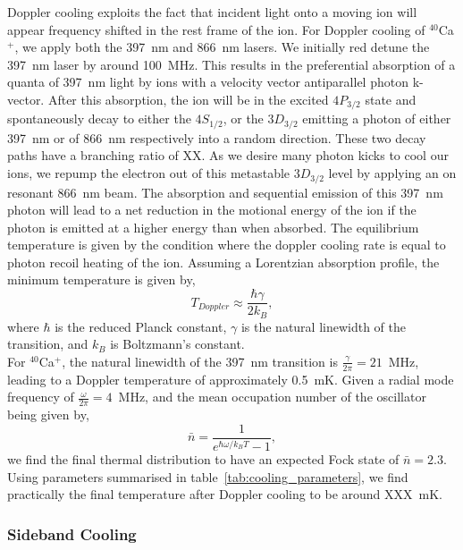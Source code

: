     Doppler cooling exploits the fact that incident light onto a moving ion will
    appear frequency shifted in the rest frame of the ion. For Doppler cooling
    of $^{40}$Ca$^+$, we apply both the 397~nm and 866~nm lasers. We initially red
    detune the 397~nm laser by around 100~MHz. This results in the preferential
    absorption of a quanta of 397~nm light by ions with a velocity vector
    antiparallel photon k-vector. After this absorption, the ion will be in the
    excited $4P_{3/2}$ state and spontaneously decay to either the $4S_{1/2}$,
    or the $3D_{3/2}$ emitting a photon of either 397~nm or of 866~nm
    respectively into a random direction. These two decay paths have a branching
    ratio of XX.  As we desire many photon kicks to cool our ions, we repump the
    electron out of this metastable $3D_{3/2}$ level by applying an on resonant
    866~nm beam.  The absorption and sequential emission of this 397~nm photon
    will lead to a net reduction in the motional energy of the ion if the photon
    is emitted at a higher energy than when absorbed. The equilibrium
    temperature is given by the condition where the doppler cooling rate is
    equal to photon recoil heating of the ion. Assuming a Lorentzian absorption
    profile, the minimum temperature is given by,
    \begin{equation}
    T_{Doppler} \approx \frac{\hbar\gamma}{2k_B},
    \end{equation}
    where $\hbar$ is the reduced Planck constant, $\gamma$ is the natural
    linewidth of the transition, and $k_B$ is Boltzmann's constant.\\ For
    $^{40}$Ca$^+$, the natural linewidth of the 397~nm transition is $\frac{\gamma}{2\pi} =
    21$~MHz, leading to a Doppler temperature of approximately 0.5~mK. Given a radial mode frequency of $\frac{\omega}{2\pi} = 4$~MHz, and the mean occupation number of the oscillator being given by,
    \begin{equation}
        \bar{n} = \frac{1}{e^{\hbar\omega/k_B T}-1},
    \end{equation}
    we find the final thermal distribution to have an expected Fock state of $\bar{n} = 2.3$.
    Using parameters summarised in table~\ref{tab:cooling_parameters}, we find practically the final temperature after Doppler cooling to be around XXX~mK.\\

\subsubsection{Sideband Cooling}

